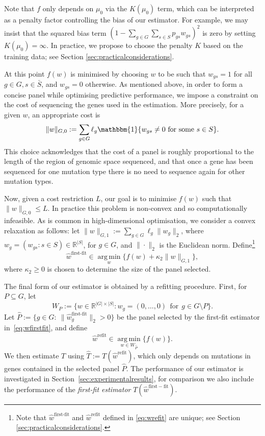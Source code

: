 \documentclass[12pt]{article}
\DeclareMathOperator*{\argmin}{arg\,min}
\begin{document}
Note that $f$ only depends on $\mu_0$ via the $K(\mu_0)$ term, which can be interpreted as a penalty factor controlling the bias of our estimator. For example, we may insist that the squared bias term $(1 - \sum_{g \in G}\sum_{s \in S}  p_{gs}w_{gs})^2$ is zero by setting $K(\mu_0) = \infty$. In practice, we propose to choose the penalty $K$ based on the training data; see Section \ref{sec:practicalconsiderations}. 

At this point $f(w)$ is minimised by choosing $w$ to be such that $w_{gs}= 1$ for all $g\in G, s\in\bar{S}$, and $w_{gs} = 0$ otherwise. As mentioned above, in order to form a concise panel while optimising predictive performance, we impose a constraint on the cost of sequencing the genes used in the estimation. More precisely, for a given $w$, an appropriate cost is
\[
\|w\|_{G,0} := \sum_{g \in G} \ell_g\mathbbm{1}\{w_{gs} \neq 0 \ \mathrm{for \ some \ } s \in S \} .
\]
This choice acknowledges that the cost of a panel is roughly proportional to the length of the region of genomic space sequenced, and that once a gene has been sequenced for one mutation type there is no need to sequence again for other mutation types. 

Now, given a cost restriction $L$, our goal is to minimise $f(w)$ such that $\|w\|_{G,0} \leq L$. In practice this problem is non-convex and so computationally infeasible. As is common in high-dimensional optimisation, we consider a convex relaxation as follows: let $\|w\|_{G,1} := \sum_{g \in G} \ell_g \|w_g\|_2$, where $w_g = (w_{gs}: s\in S) \in \mathbb{R}^{|S|}$, for $g \in G$,  and $\|\cdot\|_2$ is the Euclidean norm.  Define\footnote{Note that $\hat{w}^{\text{first-fit}}$ and $\hat{w}^{\text{refit}}$ defined in \eqref{eq:wrefit} are unique; see Section \ref{sec:practicalconsiderations}.}
\begin{equation}
    \label{eq:wfirstfit}
\hat{w}^{\text{first-fit}} \in \argmin\limits_{w} \bigl\{ f(w) +\kappa_2\|w\|_{G,1} \bigr\},
\end{equation}
where $\kappa_2 \geq 0$ is chosen to determine the size of the panel selected.

The final form of our estimator is obtained by a refitting procedure. First, for $P\subseteq G$, let
\[
W_{P} := \{ w \in \mathbb{R}^{|G| \times |S|} : w_g = (0, \ldots, 0) \ \ \text{for} \ \ g \in G\setminus P \}.
\] 
Let $\hat{P} := \{g \in G: \ \|\hat{w}^{\text{first-fit}}_g\|_2 > 0 \}$ be the panel selected by the first-fit estimator in~\eqref{eq:wfirstfit}, and define  
\begin{equation} 
\label{eq:wrefit}
\hat{w}^{\text{refit}} \in  \argmin\limits_{w \in W_{\hat{P}}} \bigl\{f(w)\bigr\}.
\end{equation}
We then estimate $T$ using $\hat{T} := T(\hat{w}^{\text{refit}})$, which only depends on mutations in genes contained in the selected panel $\hat{P}$.  The performance of our estimator is investigated in Section~\ref{sec:experimentalresults}, for comparison we also include the performance of the \emph{first-fit estimator} $T(\hat{w}^{\mathrm{first-fit}})$.
\end{document}
